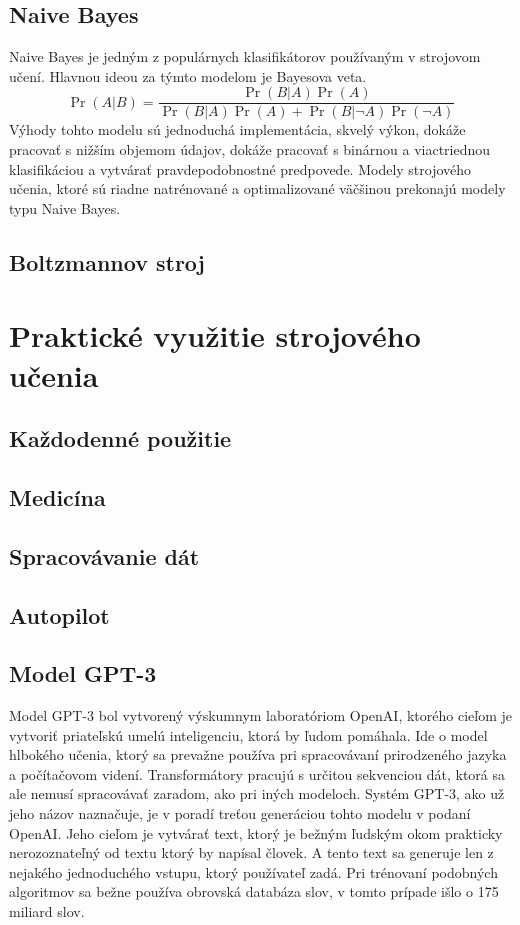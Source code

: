 \documentclass[8pt,twoside,slovak,a4paper]{article}
\begin{document}
\subsection{Naive Bayes}
Naive Bayes je jedným z populárnych klasifikátorov používaným v strojovom učení. Hlavnou ideou za týmto modelom je Bayesova veta.
\begin{equation}
 \Pr(A|B)=\frac{\Pr(B|A)\Pr(A)}{\Pr(B|A)\Pr(A)+\Pr(B|\neg A)\Pr(\neg A)}
\end{equation}
Výhody tohto modelu sú jednoduchá implementácia, skvelý výkon, dokáže pracovať s nižším objemom údajov, dokáže pracovať s binárnou a viactriednou klasifikáciou a vytvárať pravdepodobnostné predpovede. \newline \hspace*{0.4cm} Modely strojového učenia, ktoré sú riadne natrénované a optimalizované väčšinou prekonajú modely typu Naive Bayes. \cite{8862451}
\subsection{Boltzmannov stroj}
\newpage
\section{Praktické využitie strojového učenia} \label{vyuzitie}
\subsection{Každodenné použitie}
\subsection{Medicína}
\subsection{Spracovávanie dát}
\subsection{Autopilot}
\subsection{Model GPT-3}
Model GPT-3 bol vytvorený výskumnym laboratóriom OpenAI, ktorého cieľom je vytvoriť priateľskú umelú inteligenciu, ktorá by ľudom pomáhala.\cite{GPT3} Ide o model hlbokého učenia, ktorý sa prevažne používa pri spracovávaní  prirodzeného jazyka a počítačovom videní. Transformátory pracujú s určitou sekvenciou dát, ktorá sa ale nemusí spracovávať zaradom, ako pri iných modeloch.\newline \hspace*{0.4cm} Systém GPT-3, ako už jeho názov naznačuje, je v poradí treťou generáciou tohto modelu v podaní OpenAI. Jeho cieľom je vytvárať text, ktorý je bežným ľudským okom prakticky nerozoznateľný od textu ktorý by napísal človek. A tento text sa generuje len z nejakého jednoduchého vstupu, ktorý používateľ zadá. Pri trénovaní podobných algoritmov sa bežne používa obrovská databáza slov, v tomto prípade išlo o 175 miliard slov.
\end{document}

